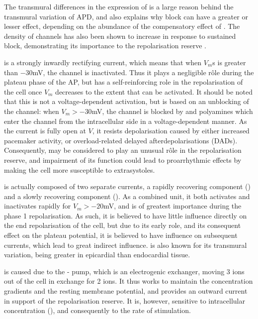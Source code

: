 \documentclass[../thesis-main.tex]{subfiles}
\begin{document}
 The transmural differences in the expression of \iks{} is a large reason behind the transmural variation of APD, and also explains why \ikr{} block can have a greater or lesser effect, depending on the abundance of the compensatory effect of \iks \citep{Vandenberg2001, Carmeliet2006}. The density of \iks{} channels has also been shown to increase in response to sustained \ikr{} block, demonstrating its importance to the repolarisation reserve \citep{Xiao2008}.
 
 \ikix{} is a strongly inwardly rectifying \K{} current, which means that when $V_m$s is greater than $-30$mV, the channel is inactivated. Thus it plays a negligible r\^ole during the plateau phase of the AP, but has a self-reinforcing role in the repolarisation of the cell once $V_m$ decreases to the extent that \ikix{} can be activated. It should be noted that this is not a voltage-dependent activation, but is based on an unblocking of the channel: when $V_m > -30$mV, the channel is blocked by \mg{} and polyamines which enter the channel from the intracellular side in a voltage-dependent manner. As the current is fully open at $V$, it resists depolarisation caused by either increased pacemaker activity, or \ca{} overload-related delayed afterdepolarisations (DADs). Consequently, \ikix{} may be considered to play an unusual r\^ole in the repolarisation reserve, and impairment of its function could lead to proarrhythmic effects by making the cell more susceptible to extrasystoles.
 
 \ito{} is actually composed of two separate currents, a rapidly recovering component (\itof{}) and a slowly recovering component (\itos{}). As a combined unit, it both activates and inactivates rapidly for $V_m > -20$mV, and is of greatest importance during the phase 1 repolarisation. As such, it is believed to have little influence directly on the end repolarisation of the cell, but due to its early role, and its consequent effect on the plateau potential, it is believed to have influence on subsequent currents, which lead to great indirect influence. \ito{} is also known for its transmural variation, being greater in epicardial than endocardial tissue.
 
 \inak{} is caused due to the \na{}-\K{} pump, which is an electrogenic exchanger, moving 3 \na{} ions out of the cell in exchange for 2 \K{} ions. It thus works to maintain the concentration gradients and the resting membrane potential, and provides an outward current in support of the repolarisation reserve. It is, however, sensitive to intracellular \na{} concentration (\nai), and consequently to the rate of stimulation.
 
\end{document}
